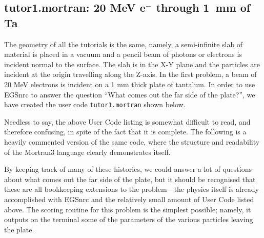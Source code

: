 \vspace*{-5mm}
\subsection{tutor1.mortran: 20 MeV e$^-$ through 1~mm of Ta}
\vspace*{-3mm}
The geometry of all the tutorials is the same,  namely, a
semi-infinite slab of material is placed in a vacuum and a pencil beam
of photons or electrons is incident normal to the surface.  The slab
is in the X-Y plane and the particles are incident at the origin
travelling along the Z-axis.  In the first problem, a beam of 20 MeV
electrons is incident on a 1 mm thick plate of tantalum.  In order to
use EGSnrc to answer the question ``What comes out the far side of the
plate?'', we have created the user code {\tt tutor1.mortran} shown below.
 
\begin{latexonly}
%

\end{latexonly}
\begin{htmlonly}
\clearpage

\clearpage
\end{htmlonly}
 
Needless to say, the above User Code listing is
somewhat difficult to read, and therefore confusing, in
spite of the fact that it is complete.  The following is
a heavily commented version of the same code, where the structure and
readability of the Mortran3 language clearly demonstrates itself.
 
\newpage
\begin{latexonly}
%

\clearpage
%

\clearpage
\end{latexonly}
 
\begin{htmlonly}
\clearpage
%

\clearpage
%

\clearpage
\end{htmlonly}
 
By keeping track of many of these histories, we could answer a lot of
questions about what comes out the far side of the plate, but it
should be recognised that these are all bookkeeping extensions to the
problem---the physics itself is already accomplished with EGSnrc and the
relatively small amount of User Code listed above.  The scoring
routine for this problem is the simplest possible; namely, it outputs
on the terminal some of the parameters of the various particles
leaving the plate.
 
